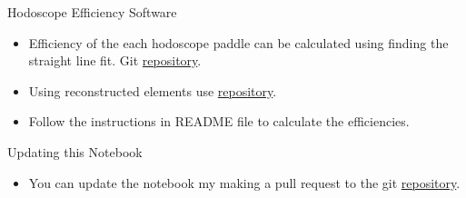 \documentclass[10pt, xcolor={dvipsnames}, aspectratio = 169, sans,mathserif]{beamer}
\begin{document}
\begin{frame}{Hodoscope Efficiency Software}

\begin{itemize}

    \item Efficiency of the each hodoscope paddle can be calculated using finding the straight line fit. Git \href{https://github.com/forhadnmsu/e1039-analysis/tree/hodo-hvScan/AnaRealDst}{repository}.

    \item Using reconstructed elements use \href{https://github.com/forhadnmsu/e1039-analysis/tree/ktracker-eff/AnaRealDst}{repository}.

    \item Follow the instructions in README file to calculate the efficiencies.

\end{itemize}

\end{frame}

\begin{frame}{Updating this Notebook}

\begin{itemize}

    \item You can update the notebook my making a pull request to the git \href{https://github.com/dinupa1/NIM_Hodo_Handbook}{repository}.

\end{itemize}

\end{frame}
\end{document}
